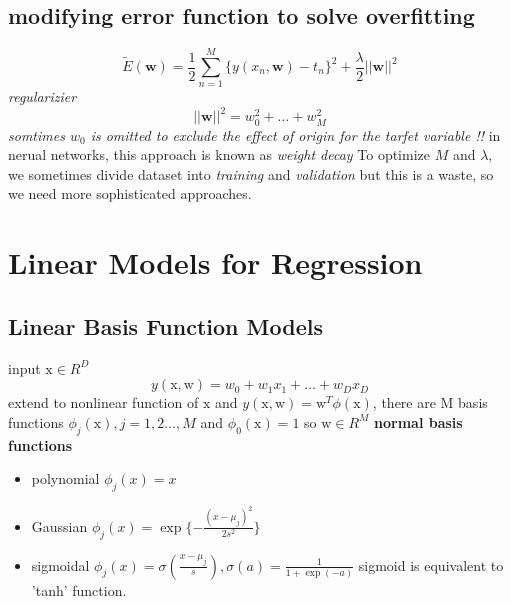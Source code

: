 \documentclass[a4paper]{book}
\begin{document}
\subsection{modifying error function to solve overfitting}
\begin{equation}\label{2.4}
\tilde{E}(\textbf{w}) = \frac12\sum_{n=1}^M\{y(x_n,\textbf{w})-t_n\}^2+\frac{\lambda}{2}||\textbf{w}||^2
\end{equation}
\emph{regularizier} $$||\textbf{w}||^2 = w_0^2+\dots+w_M^2$$
\emph{somtimes $w_0$ is omitted to exclude the effect of origin for the tarfet variable !!}
in nerual networks, this approach is known as \emph{weight decay}
To optimize $M$ and $\lambda$, we sometimes divide dataset into \emph{training} and \emph{validation} but this is a waste, so we need more sophisticated approaches.






\section{Linear Models for Regression}
\subsection{Linear Basis Function Models}
input $\mathrm x\in R^D$
\begin{equation}\label{eq2.2.1}
  y(\mathrm x,\mathrm w) = w_0+w_1x_1+\dots +w_Dx_D
\end{equation}
extend to nonlinear function of $\mathrm x$ and $y(\mathrm x,\mathrm w) =\mathrm w^T\phi(\mathrm x)$, there are M basis functions $\phi_j(\mathrm x), j=1,2\dots,M$ and $\phi_0(\mathrm x) = 1$\newline
so $\mathrm w\in R^M$
\textbf{normal basis functions}
\begin{itemize}
  \item polynomial $\phi_j(x) = x$
  \item Gaussian $\phi_j(x) = \exp\{-\frac{(x-\mu_j)^2}{2s^2}\}$
  \item sigmoidal $\phi_j(x) = \sigma(\frac{x-\mu_j}{s}) , \sigma(a) = \frac1{1+\exp(-a)}$ sigmoid is equivalent to 'tanh' function.
\end{itemize}
\end{document}

